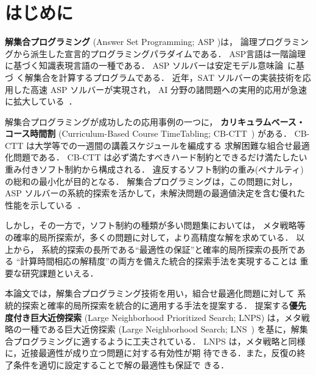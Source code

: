 \section{はじめに}

\textbf{解集合プログラミング}
(Answer Set Programming; ASP
\cite{%
  baral03:cambridge,%
  DBLP:conf/iclp/GelfondL88,%
  DBLP:journals/amai/Niemela99})は，
論理プログラミングから派生した宣言的プログラミングパラダイムである．
ASP言語は一階論理に基づく知識表現言語の一種である．
ASP ソルバーは安定モデル意味論~\cite{DBLP:conf/iclp/GelfondL88}に基づ
く解集合を計算するプログラムである．
近年，SAT ソルバーの実装技術を応用した高速 ASP ソルバーが実現され，
AI 分野の諸問題への実用的応用が急速に拡大している~\cite{ergele16a}．

解集合プログラミングが成功したの応用事例の一つに，
\textbf{カリキュラムベース・コース時間割}
(Curriculum-Based Course TimeTabling; CB-CTT~\cite{DBLP:journals/anor/BonuttiCGS12})
がある．
CB-CTT は大学等での一週間の講義スケジュールを編成する
求解困難な組合せ最適化問題である．
CB-CTT は必ず満たすべきハード制約とできるだけ満たしたい
重み付きソフト制約から構成される．
違反するソフト制約の重み(ペナルティ)の総和の最小化が目的となる．
解集合プログラミングは，この問題に対し，
ASP ソルバーの系統的探索を活かして，未解決問題の最適値決定を含む優れた
性能を示している~\cite{anor/Banbara2019}．

しかし，その一方で，ソフト制約の種類が多い問題集においては，
メタ戦略等の確率的局所探索が，多くの問題に対して，より高精度な解を求めている．
以上から，
系統的探索の長所である``最適性の保証''と確率的局所探索の長所である
``計算時間相応の解精度''の両方を備えた統合的探索手法を実現することは
重要な研究課題といえる．

本論文では，解集合プログラミング技術を用い，組合せ最適化問題に対して
系統的探索と確率的局所探索を統合的に適用する手法を提案する．
%
提案する\textbf{優先度付き巨大近傍探索}
(Large Neighborhood Prioritized Search; LNPS)
は，メタ戦略の一種である巨大近傍探索
(Large Neighborhood Search; LNS~\cite{Pisinger10})
を基に，解集合プログラミングに適するように工夫されている．
LNPS は，メタ戦略と同様に，近接最適性が成り立つ問題に対する有効性が期
待できる．また，反復の終了条件を適切に設定することで解の最適性も保証で
きる．


